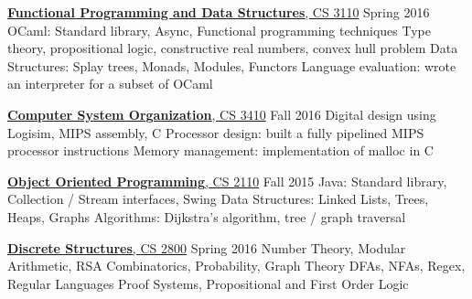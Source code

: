 \documentclass[letterpaper,10pt,oneside]{simpleresume}
\begin{document}
\begin{minipage}[t][0pt]{\linewidth}
\begin{body}
\href{https://www.cs.cornell.edu/courses/cs3110/2016sp/}
{\textbf{Functional Programming and Data Structures}, CS 3110}
\hfill Spring 2016
\BulletItem%
OCaml: Standard library, Async, Functional programming techniques
\BulletItem%
Type theory, propositional logic, constructive real numbers, convex hull problem
\BulletItem%
Data Structures: Splay trees, Monads, Modules, Functors
\BulletItem%
Language evaluation: wrote an interpreter for a subset of OCaml

\href{https://www.cs.cornell.edu/courses/cs3410/2016fa/}
{\textbf{Computer System Organization}, CS 3410}
\hfill Fall 2016
\BulletItem%
Digital design using Logisim, MIPS assembly, C
\BulletItem%
Processor design: built a fully pipelined MIPS processor
instructions
\BulletItem%
Memory management: implementation of malloc in C

\href{https://www.cs.cornell.edu/courses/cs2110/2015fa/}
{\textbf{Object Oriented Programming}, CS 2110}
\hfill Fall 2015
\BulletItem%
Java: Standard library, Collection / Stream interfaces, Swing
\BulletItem%
Data Structures: Linked Lists, Trees, Heaps, Graphs
\BulletItem%
Algorithms: Dijkstra's algorithm, tree / graph traversal

\href{https://www.cs.cornell.edu/courses/cs2800/2016sp/}
{\textbf{Discrete Structures}, CS 2800}
\hfill Spring 2016
\BulletItem%
Number Theory, Modular Arithmetic, RSA
\BulletItem%
Combinatorics, Probability, Graph Theory
\BulletItem%
DFAs, NFAs, Regex, Regular Languages
\BulletItem%
Proof Systems, Propositional and First Order Logic



\end{body}
\end{minipage}
\end{document}
